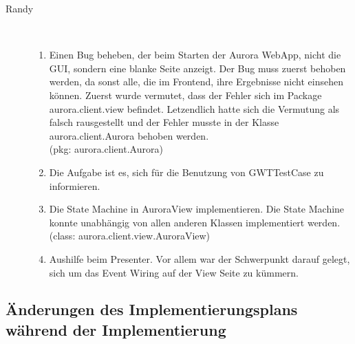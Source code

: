 \documentclass[parskip=full,11pt,twoside]{scrartcl}
\begin{document}
\begin{description}
    \item [Randy]\hfill \\
    \begin{enumerate}
    \item Einen Bug beheben, der beim Starten der Aurora WebApp, nicht die GUI, sondern eine blanke Seite anzeigt. Der Bug muss zuerst behoben werden, da sonst alle, die im Frontend, ihre Ergebnisse nicht einsehen können. Zuerst wurde vermutet, dass der Fehler sich im Package aurora.client.view befindet. Letzendlich hatte sich die Vermutung als falsch rausgestellt und der Fehler musste in der Klasse aurora.client.Aurora behoben werden. \\(pkg: aurora.client.Aurora)
    \item Die Aufgabe ist es, sich für die Benutzung von GWTTestCase zu informieren. 
    \item Die State Machine in AuroraView implementieren. Die State Machine konnte unabhängig von allen anderen Klassen implementiert werden. \\(class: aurora.client.view.AuroraView) 
    \item Aushilfe beim Presenter. Vor allem war der Schwerpunkt darauf gelegt, sich um das Event Wiring auf der View Seite zu kümmern.
    \end{enumerate}
\end{description}



\subsection{Änderungen des Implementierungsplans während der Implementierung}
\end{document}
